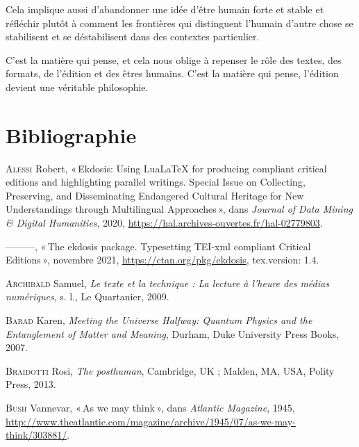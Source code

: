 Cela implique aussi d'abandonner une idée d'être humain forte et stable
et réfléchir plutôt à comment les frontières qui distinguent l'humain
d'autre chose se stabilisent et se déstabilisent dans des contextes
particulier.

C'est la matière qui pense, et cela nous oblige à repenser le rôle des
textes, des formats, de l'édition et des êtres humains. C'est la matière
qui pense, l'édition devient une véritable philosophie.

\hypertarget{bibliographie}{%
\chapter{Bibliographie}\label{bibliographie}}

\hypertarget{refs}{}
\begin{CSLReferences}{1}{0}
\leavevmode{}%
\textsc{Alessi} Robert, {«\,Ekdosis: {Using} {LuaLaTeX} for producing
compliant critical editions and highlighting parallel writings.
{Special} {Issue} on {Collecting}, {Preserving}, and {Disseminating}
{Endangered} {Cultural} {Heritage} for {New} {Understandings} through
{Multilingual} {Approaches}\,»}, dans \emph{Journal of Data Mining \&
Digital Humanities}, 2020,
\url{https://hal.archives-ouvertes.fr/hal-02779803}.

\leavevmode{}%
---------, {«\,The ekdosis package. {Typesetting} {TEI}-xml compliant
{Critical} {Editions}\,»}, novembre 2021,
\url{https://ctan.org/pkg/ekdosis}, tex.version: 1.4.

\leavevmode{}%
\textsc{Archibald} Samuel, \emph{Le texte et la technique : {La} lecture
à l'heure des médias numériques}, s. l., Le Quartanier, 2009.

\leavevmode{}%
\textsc{Barad} Karen, \emph{Meeting the {Universe} {Halfway}: {Quantum}
{Physics} and the {Entanglement} of {Matter} and {Meaning}}, Durham,
Duke University Press Books, 2007.

\leavevmode{}%
\textsc{Braidotti} Rosi, \emph{The posthuman}, Cambridge, UK ; Malden,
MA, USA, Polity Press, 2013.

\leavevmode{}%
\textsc{Bush} Vannevar, {«\,As we may think\,»}, dans \emph{Atlantic
Magazine}, 1945,
\url{http://www.theatlantic.com/magazine/archive/1945/07/as-we-may-think/303881/}.


\end{CSLReferences}
